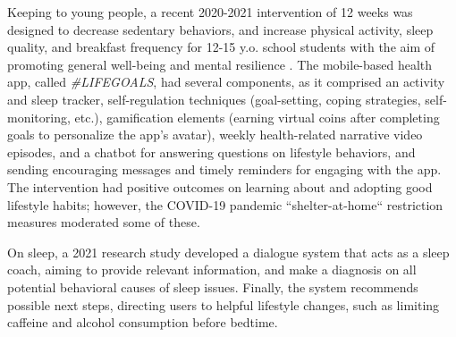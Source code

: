 Keeping to young people, a recent 2020-2021 intervention of 12 weeks was designed to decrease sedentary behaviors, and increase physical activity, sleep quality, and breakfast frequency for 12-15 y.o. school students with the aim of promoting general well-being and mental resilience \cite{healthylifestyleadolescents2024}. The mobile-based health app, called \textit{\#LIFEGOALS}, had several components, as it comprised an activity and sleep tracker, self-regulation techniques (goal-setting, coping strategies, self-monitoring, etc.), gamification elements (earning virtual coins after completing goals to personalize the app's  avatar), weekly health-related narrative video episodes, and a chatbot for answering questions on lifestyle behaviors, and sending encouraging messages and timely reminders for engaging with the app. The intervention had positive outcomes on learning about and adopting good lifestyle habits; however, the COVID-19 pandemic ``shelter-at-home`` restriction measures moderated some of these.

On sleep, a 2021 research study developed a dialogue system that acts as a sleep coach, aiming to provide relevant information, and make a diagnosis on all potential behavioral causes of sleep issues. Finally, the system recommends possible next steps, directing users to helpful lifestyle changes, such as limiting caffeine and alcohol consumption before bedtime.


